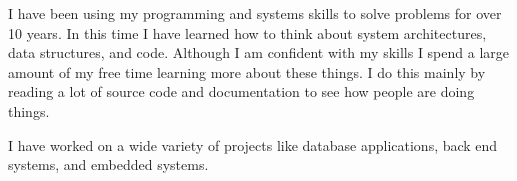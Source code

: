 \documentclass[12pt]{article}
\begin{document}
I have been using my programming and systems skills to solve problems
for over 10 years.  In this time I have learned how to think about system
architectures, data structures, and code.  Although I am confident with
my skills I spend a large amount of my free time learning more about
these things.  I do this mainly by reading a lot of source code and
documentation to see how people are doing things.

I have worked on a wide variety of projects like database applications,
back end systems, and embedded systems.
\end{document}
